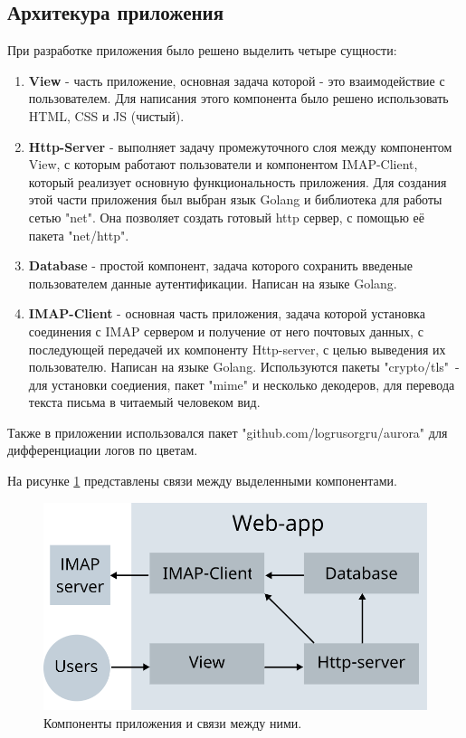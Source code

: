 \documentclass[a4paper,14pt]{extarticle}
\begin{document}
\subsection{Архитекура приложения}

    При разработке приложения было решено выделить четыре сущности:

    \begin{enumerate}
        \item \textbf{View} - часть приложение, основная задача которой - это взаимодействие с пользователем. 
        Для написания этого компонента было решено использовать HTML, CSS и JS (чистый).
        \item \textbf{Http-Server} - выполняет задачу промежуточного слоя между компонентом View, с которым работают пользователи
        и компонентом IMAP-Client, который реализует основную функциональность приложения. Для создания этой части приложения был выбран язык Golang
        и библиотека для работы сетью "net". Она позволяет создать готовый http сервер, с помощью её пакета "net/http".
        \item \textbf{Database} - простой компонент, задача которого сохранить введеные пользователем данные аутентификации. Написан на языке Golang.
        \item \textbf{IMAP-Client} - основная часть приложения, задача которой установка соединения с IMAP сервером и получение
        от него почтовых данных, с последующей передачей их компоненту Http-server, с целью выведения их пользователю. Написан на языке Golang.
        Используются пакеты "crypto/tls"\ - для установки соедиения, пакет "mime" и несколько декодеров, для перевода текста письма в читаемый человеком вид.
    \end{enumerate}

    Также в приложении использовался пакет 
    "github.com/logrusorgru/aurora"{} для дифференциации логов по цветам.

    \newpage

    На рисунке \ref{architecture} представлены связи между выделенными компонентами.

    \begin{figure}[H]
        \begin{center}
            \includegraphics[scale=0.4]{pics/architecture}
            \caption{Компоненты приложения и связи между ними.}
            \label{architecture}
        \end{center}
    \end{figure}
\end{document}
